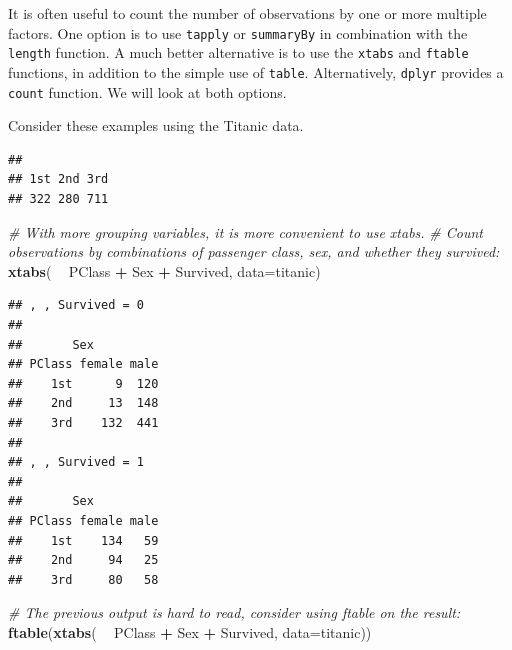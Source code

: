 \documentclass[]{book}
\newenvironment{Shaded}{\begin{snugshade}}{\end{snugshade}}
\newcommand{\CommentTok}[1]{\textcolor[rgb]{0.56,0.35,0.01}{\textit{#1}}}
\newcommand{\DataTypeTok}[1]{\textcolor[rgb]{0.13,0.29,0.53}{#1}}
\newcommand{\KeywordTok}[1]{\textcolor[rgb]{0.13,0.29,0.53}{\textbf{#1}}}
\newcommand{\NormalTok}[1]{#1}
\newcommand{\OperatorTok}[1]{\textcolor[rgb]{0.81,0.36,0.00}{\textbf{#1}}}
\newcommand{\StringTok}[1]{\textcolor[rgb]{0.31,0.60,0.02}{#1}}
\begin{document}
It is often useful to count the number of observations by one or more multiple factors. One option is to use \texttt{tapply} or \texttt{summaryBy} in combination with the \texttt{length} function. A much better alternative is to use the \texttt{xtabs} and \texttt{ftable} functions, in addition to the simple use of \texttt{table}. Alternatively, \texttt{dplyr} provides a \texttt{count} function. We will look at both options.

Consider these examples using the Titanic data.

\begin{Shaded}
\end{Shaded}

\begin{verbatim}
## 
## 1st 2nd 3rd 
## 322 280 711
\end{verbatim}

\begin{Shaded}
\begin{Highlighting}[]
\CommentTok{# With more grouping variables, it is more convenient to use xtabs.}
\CommentTok{# Count observations by combinations of passenger class, sex, and whether they survived:}
\KeywordTok{xtabs}\NormalTok{( }\OperatorTok{~}\StringTok{ }\NormalTok{PClass }\OperatorTok{+}\StringTok{ }\NormalTok{Sex }\OperatorTok{+}\StringTok{ }\NormalTok{Survived, }\DataTypeTok{data=}\NormalTok{titanic)}
\end{Highlighting}
\end{Shaded}

\begin{verbatim}
## , , Survived = 0
## 
##       Sex
## PClass female male
##    1st      9  120
##    2nd     13  148
##    3rd    132  441
## 
## , , Survived = 1
## 
##       Sex
## PClass female male
##    1st    134   59
##    2nd     94   25
##    3rd     80   58
\end{verbatim}

\begin{Shaded}
\begin{Highlighting}[]
\CommentTok{# The previous output is hard to read, consider using ftable on the result:}
\KeywordTok{ftable}\NormalTok{(}\KeywordTok{xtabs}\NormalTok{( }\OperatorTok{~}\StringTok{ }\NormalTok{PClass }\OperatorTok{+}\StringTok{ }\NormalTok{Sex }\OperatorTok{+}\StringTok{ }\NormalTok{Survived, }\DataTypeTok{data=}\NormalTok{titanic))}
\end{Highlighting}
\end{Shaded}
\end{document}
